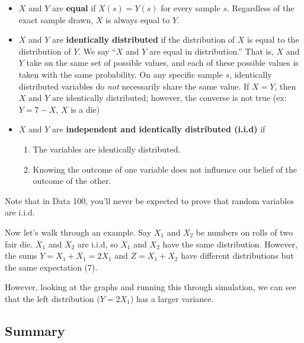 \documentclass[
  letterpaper,
  DIV=11,
  numbers=noendperiod]{scrreprt}
\providecommand{\tightlist}{%
  \setlength{\itemsep}{0pt}\setlength{\parskip}{0pt}}\usepackage{longtable,booktabs,array}
\begin{document}
\begin{itemize}
\tightlist
\item
  \(X\) and \(Y\) are \textbf{equal} if \(X(s) = Y(s)\) for every sample
  \(s\). Regardless of the exact sample drawn, \(X\) is always equal to
  \(Y\).
\item
  \(X\) and \(Y\) are \textbf{identically distributed} if the
  distribution of \(X\) is equal to the distribution of \(Y\). We say
  ``\(X\) and \(Y\) are equal in distribution.'' That is, \(X\) and
  \(Y\) take on the same set of possible values, and each of these
  possible values is taken with the same probability. On any specific
  sample \(s\), identically distributed variables do \emph{not}
  necessarily share the same value. If \(X = Y\), then \(X\) and \(Y\)
  are identically distributed; however, the converse is not true (ex:
  \(Y = 7 - X\), \(X\) is a die)
\item
  \(X\) and \(Y\) are \textbf{independent and identically distributed
  (i.i.d)} if

  \begin{enumerate}
  \def\labelenumi{\arabic{enumi}.}
  \tightlist
  \item
    The variables are identically distributed.
  \item
    Knowing the outcome of one variable does not influence our belief of
    the outcome of the other.
  \end{enumerate}
\end{itemize}

Note that in Data 100, you'll never be expected to prove that random
variables are i.i.d.

Now let's walk through an example. Say \(X_1\) and \(X_2\) be numbers on
rolls of two fair die. \(X_1\) and \(X_2\) are i.i.d, so \(X_1\) and
\(X_2\) have the same distribution. However, the sums
\(Y = X_1 + X_1 = 2X_1\) and \(Z=X_1+X_2\) have different distributions
but the same expectation (7).

However, looking at the graphs and running this through simulation, we
can see that the left distribution (\(Y = 2X_1\)) has a larger variance.

\subsection{Summary}\label{summary-2}
\end{document}

